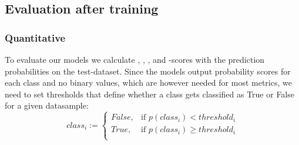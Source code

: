 \subsection{Evaluation after training}\label{sec:evaluation}

\subsubsection{Quantitative}
To evaluate our models we calculate , , ,  and -scores \autocite{metrics} with the prediction probabilities on the test-dataset. Since the models output probability scores for each class and no binary values, which are however needed for most metrics, we need to set thresholds that define whether a class gets classified as True or False for a given datasample:
\begin{equation}
	class_i:=
	\begin{cases}
		False,& \text{if } p(class_i) < threshold_i\\
		True,& \text{if } p(class_i) \geq threshold_i\\
	\end{cases}
	\label{eqn:thresh}
\end{equation}

